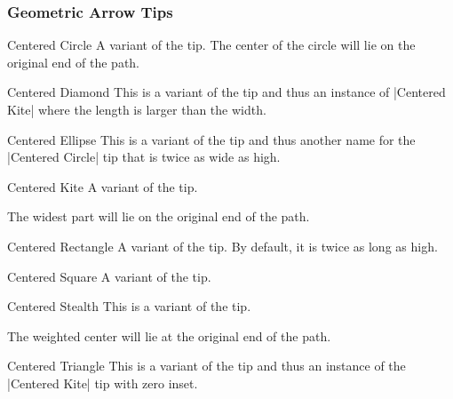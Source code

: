 \begin{multicols}{2}
\subsubsection{Geometric Arrow Tips}
\begin{arrowtipsimple}{Centered Circle}
    A variant of the  tip.
    The center of the circle will lie on the original end of the path.
\end{arrowtipsimple}

\begin{arrowtipsimple}{Centered Diamond}
    This is a variant of the  tip and
    thus an instance of |Centered Kite| where the length is larger than the width.
\end{arrowtipsimple}

\begin{arrowtipsimple}{Centered Ellipse}
    This is a variant of the  tip
    and thus another name for the |Centered Circle| tip
    that is twice as wide as high.
\end{arrowtipsimple}

\begin{arrowtipsimple}{Centered Kite}
    A variant of the  tip.
    
    The widest part will lie on the original end of the path.
\end{arrowtipsimple}

\begin{arrowtipsimple}{Centered Rectangle}
    A variant of the  tip.
    By default, it is twice as long as high.
\end{arrowtipsimple}

\begin{arrowtipsimple}{Centered Square}
    A variant of the  tip.
\end{arrowtipsimple}

\begin{arrowtipsimple}{Centered Stealth}
    This is a variant of the  tip.
    
    The weighted center will lie at the original end of the path.
\end{arrowtipsimple}

\begin{arrowtipsimple}{Centered Triangle}
    This is a variant of the  tip and
    thus an instance of the |Centered Kite| tip with zero inset.
\end{arrowtipsimple}


\end{multicols}
